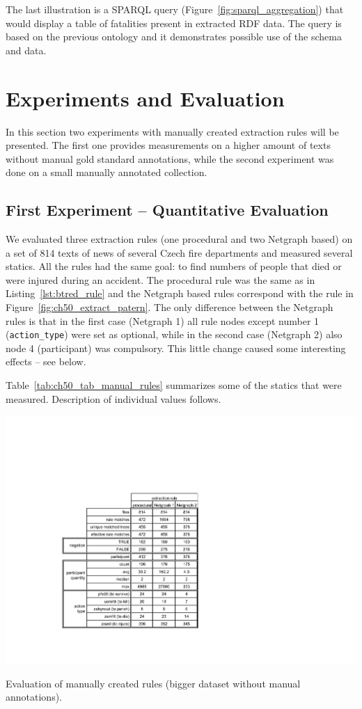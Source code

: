 The last illustration is a SPARQL query (Figure~\ref{fig:sparql_aggregation}) that would display a table of fatalities present in extracted RDF data. The query is based on the previous ontology and it demonstrates possible use of the schema and data.


\section{Experiments and Evaluation}


In this section two experiments with manually created extraction rules will be presented. The first one provides measurements on a higher amount of texts without manual gold standard annotations, while the second experiment was done on a small manually annotated collection. 

\subsection{First Experiment -- Quantitative Evaluation} \label{sec:ch50_quant_experiment}

We evaluated three extraction rules (one procedural and two Netgraph based) on a set of 814 texts of news of several Czech fire departments and measured several statics. All the rules had the same goal: to find numbers of people that died or were injured during an accident. The procedural rule was the same as in Listing~\ref{lst:btred_rule} and the Netgraph based rules correspond with the rule in Figure~\ref{fig:ch50_extract_patern}. The only difference between the Netgraph rules is that in the first case (Netgraph 1) all rule nodes except number 1 (\verb+action_type+) were set as optional, while in the second case (Netgraph 2) also node 4 (participant) was compulsory. This little change caused some interesting effects -- see below. 

Table~\ref{tab:ch50_tab_manual_rules} summarizes some of the statics that were measured. Description of individual values follows.

\begin{table}
	\centering
		\includegraphics[angle=-90,width=0.6\hsize]{tab_manual_rules}
	\caption{Evaluation of manually created rules (bigger dataset without manual annotations).}
	\label{tab:ch50_tab_manual_rules}
\end{table}


